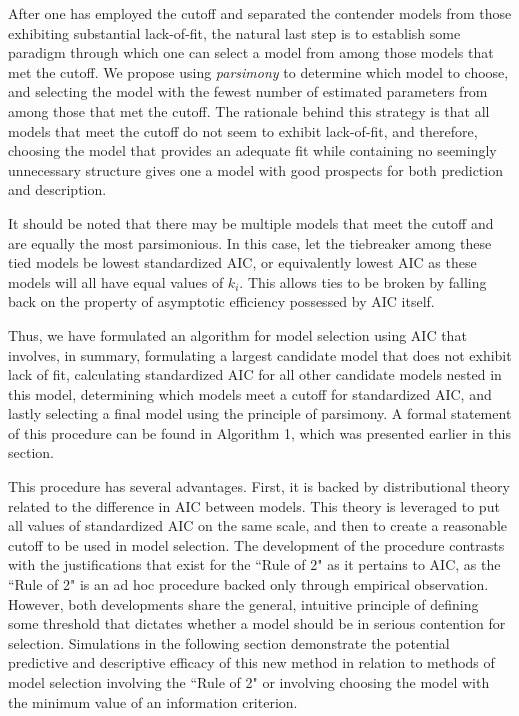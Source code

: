 		After one has employed the cutoff and separated the contender models from those exhibiting substantial lack-of-fit, the natural last step is to establish some paradigm
		through which one can select a model from among those models that met the cutoff. We propose using \textit{parsimony} to determine which model to choose, and selecting
		the model with the fewest number of estimated parameters from among those that met the cutoff. The rationale behind this strategy is that all models that meet the cutoff do
		not seem to exhibit lack-of-fit, and therefore, choosing the model that provides an adequate fit while containing no seemingly unnecessary structure
		gives one a model with good prospects for both prediction and description.
		
		It should be noted that there may be multiple models that meet the cutoff and are equally the most parsimonious. In this case, let the tiebreaker among these tied models be
		lowest standardized AIC, or equivalently lowest AIC as these models will all have equal values of $k_i$. This allows ties to be broken
		by falling back on the property of asymptotic efficiency possessed by AIC itself.

		Thus, we have formulated an algorithm for model selection using AIC that involves, in summary, formulating a largest candidate model that does not exhibit lack of
		fit, calculating standardized AIC for all other candidate models nested in this model, determining which models meet a cutoff for standardized AIC, and lastly selecting
		a final model using the principle of parsimony. A formal statement of this procedure can be found in Algorithm 1, which was presented earlier in this section.

		This procedure has several advantages. First, it is backed by distributional theory related to the difference in AIC between models. This theory is leveraged
		to put all values of standardized AIC on the same scale, and then to create a reasonable cutoff to be used in model selection. The development of the procedure
		contrasts with the justifications that exist for the ``Rule of 2" as it pertains to AIC, as the ``Rule of 2" is an ad hoc procedure backed only through empirical
		observation. However, both developments share the general, intuitive principle of defining some threshold that dictates whether a model should be in serious
		contention for selection. Simulations in the following section demonstrate the potential predictive and descriptive efficacy of this new method in relation
		to methods of model selection involving the ``Rule of 2" or involving choosing the model with the minimum value of an information criterion.
		
